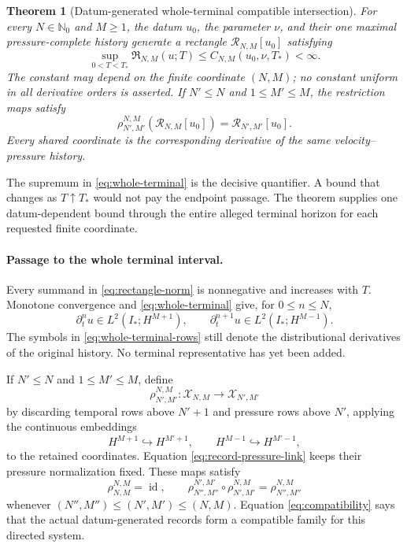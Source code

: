 \documentclass[11pt,letterpaper]{article}
\newtheorem{theorem}{Theorem}
\theoremstyle{definition}
\theoremstyle{remark}
\newcommand{\Nzero}{\mathbb N_0}
\newcommand{\cR}{\mathcal R}
\newcommand{\frakR}{\mathfrak R}
\newcommand{\Istar}{I_*}
\begin{document}
\begin{theorem}[Datum-generated whole-terminal compatible intersection]
\label{thm:intersection}
For every \(N\in\Nzero\) and \(M\ge1\), the datum \(u_0\), the parameter
\(\nu\), and
their one maximal pressure-complete history generate a rectangle
\(\cR_{N,M}[u_0]\) satisfying
\begin{equation}
\boxed{
\sup_{0<T<T_*}\frakR_{N,M}(u;T)
\le C_{N,M}(u_0,\nu,T_*)<\infty.}
\label{eq:whole-terminal}
\end{equation}
The constant may depend on the finite coordinate \((N,M)\); no constant
uniform in all derivative orders is asserted.  If \(N'\le N\) and
\(1\le M'\le M\), the restriction maps satisfy
\begin{equation}
\rho_{N',M'}^{N,M}\!\left(\cR_{N,M}[u_0]\right)
=\cR_{N',M'}[u_0].
\label{eq:compatibility}
\end{equation}
Every shared coordinate is the corresponding derivative of the same
velocity--pressure history.
\end{theorem}

The supremum in \eqref{eq:whole-terminal} is the decisive quantifier.  A
bound that changes as \(T\uparrow T_*\) would not pay the endpoint passage.
The theorem supplies one datum-dependent bound through the entire alleged
terminal horizon for each requested finite coordinate.

\paragraph{Passage to the whole terminal interval.}
Every summand in \eqref{eq:rectangle-norm} is nonnegative and increases with
\(T\).  Monotone convergence and \eqref{eq:whole-terminal} give, for
\(0\le n\le N\),
\begin{equation}
\partial_t^n u\in L^2(\Istar;H^{M+1}),
\qquad
\partial_t^{n+1}u\in L^2(\Istar;H^{M-1}).
\label{eq:whole-terminal-rows}
\end{equation}
The symbols in \eqref{eq:whole-terminal-rows} still denote the
distributional derivatives of the original history.  No terminal
representative has yet been added.

If \(N'\le N\) and \(1\le M'\le M\), define
\[
\rho_{N',M'}^{N,M}:
\mathscr X_{N,M}\longrightarrow
\mathscr X_{N',M'}
\]
by discarding temporal rows above \(N'+1\) and pressure rows above \(N'\), applying
the continuous embeddings
\[
H^{M+1}\hookrightarrow H^{M'+1},
\qquad
H^{M-1}\hookrightarrow H^{M'-1},
\]
to the retained coordinates.  Equation \eqref{eq:record-pressure-link}
keeps their pressure normalization fixed.
These maps satisfy
\begin{equation}
\rho_{N,M}^{N,M}=\operatorname{id},
\qquad
\rho_{N'',M''}^{N',M'}\circ\rho_{N',M'}^{N,M}
=\rho_{N'',M''}^{N,M}
\label{eq:bonding-composition}
\end{equation}
whenever \((N'',M'')\le(N',M')\le(N,M)\).
Equation \eqref{eq:compatibility} says that the actual datum-generated
records form a compatible family for this directed system.
\end{document}
